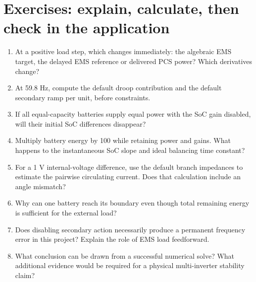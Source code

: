 \documentclass[11pt,a4paper]{article}
\begin{document}
\section{Exercises: explain, calculate, then check in the application}
\begin{enumerate}
\item At a positive load step, which changes immediately: the algebraic EMS target, the delayed EMS reference or delivered PCS power? Which derivatives change?
\item At 59.8 Hz, compute the default droop contribution and the default secondary ramp per unit, before constraints.
\item If all equal-capacity batteries supply equal power with the SoC gain disabled, will their initial SoC differences disappear?
\item Multiply battery energy by 100 while retaining power and gains. What happens to the instantaneous SoC slope and ideal balancing time constant?
\item For a 1 V internal-voltage difference, use the default branch impedances to estimate the pairwise circulating current. Does that calculation include an angle mismatch?
\item Why can one battery reach its boundary even though total remaining energy is sufficient for the external load?
\item Does disabling secondary action necessarily produce a permanent frequency error in this project? Explain the role of EMS load feedforward.
\item What conclusion can be drawn from a successful numerical solve? What additional evidence would be required for a physical multi-inverter stability claim?
\end{enumerate}
\end{document}
